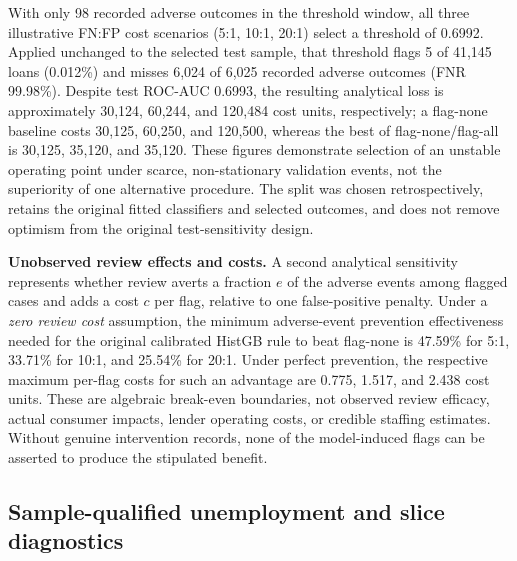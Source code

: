 \documentclass[10pt]{article}
\begin{document}
With only 98 recorded adverse outcomes in the threshold window, all three illustrative FN:FP cost scenarios (5:1, 10:1, 20:1) select a threshold of 0.6992. Applied unchanged to the selected test sample, that threshold flags 5 of 41,145 loans (0.012\%) and misses 6,024 of 6,025 recorded adverse outcomes (FNR 99.98\%). Despite test ROC-AUC 0.6993, the resulting analytical loss is approximately 30,124, 60,244, and 120,484 cost units, respectively; a flag-none baseline costs 30,125, 60,250, and 120,500, whereas the best of flag-none/flag-all is 30,125, 35,120, and 35,120. These figures demonstrate selection of an unstable operating point under scarce, non-stationary validation events, not the superiority of one alternative procedure. The split was chosen retrospectively, retains the original fitted classifiers and selected outcomes, and does not remove optimism from the original test-sensitivity design.

\noindent\textbf{Unobserved review effects and costs.} A second analytical sensitivity represents whether review averts a fraction $e$ of the adverse events among flagged cases and adds a cost $c$ per flag, relative to one false-positive penalty. Under a \emph{zero review cost} assumption, the minimum adverse-event prevention effectiveness needed for the original calibrated HistGB rule to beat flag-none is 47.59\% for 5:1, 33.71\% for 10:1, and 25.54\% for 20:1. Under perfect prevention, the respective maximum per-flag costs for such an advantage are 0.775, 1.517, and 2.438 cost units. These are algebraic break-even boundaries, not observed review efficacy, actual consumer impacts, lender operating costs, or credible staffing estimates. Without genuine intervention records, none of the model-induced flags can be asserted to produce the stipulated benefit.

\subsection{Sample-qualified unemployment and slice diagnostics}
\label{sec:subgroup}
\end{document}
